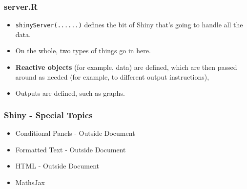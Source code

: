 \documentclass{beamer}
\begin{document}
\begin{frame}
	\frametitle{server.R}
	\Large
	
	\begin{itemize}
		\item \texttt{shinyServer(...{...})} defines the bit of Shiny that's
		going to handle all the data. 
		\item On the whole, two types of things go in here. \item \textbf{Reactive
			objects} (for example, data) are defined, which are then passed around as needed (for
		example, to different output instructions), \item Outputs are defined, such as graphs.
	\end{itemize}
\end{frame}


\begin{frame}
	\frametitle{Shiny - Special Topics}
	\LARGE
	\begin{itemize}
		\item Conditional Panels - Outside Document
		\item Formatted Text - Outside Document
		
		\item HTML - Outside Document
		
		\item MathsJax
	\end{itemize}
	
	
\end{frame}
\end{document}
